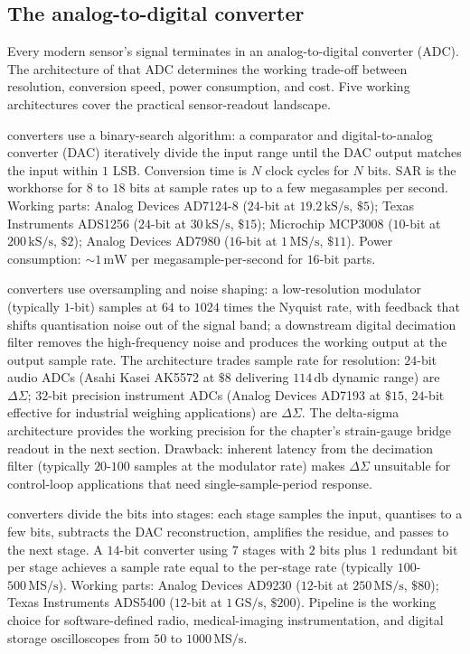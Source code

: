 \subsection{The analog-to-digital converter}

Every modern sensor's signal terminates in an analog-to-digital
converter (ADC). The architecture of that ADC determines the
working trade-off between resolution, conversion speed, power
consumption, and cost. Five working architectures cover the
practical sensor-readout landscape.

 converters use a
binary-search algorithm: a comparator and digital-to-analog
converter (DAC) iteratively divide the input range until the DAC
output matches the input within $1$ LSB. Conversion time is $N$
clock cycles for $N$ bits. SAR is the workhorse for $8$ to $18$
bits at sample rates up to a few megasamples per second. Working
parts: Analog Devices AD7124-8 ($24$-bit at $19.2\,\text{kS/s}$,
$\$5$); Texas Instruments ADS1256 ($24$-bit
at $30\,\text{kS/s}$, $\$15$); Microchip MCP3008
($10$-bit at $200\,\text{kS/s}$, $\$2$); Analog
Devices AD7980 ($16$-bit at $1\,\text{MS/s}$,
$\$11$). Power consumption: $\sim 1\,\si{\milli\watt}$ per
megasample-per-second for $16$-bit parts.

 converters
use oversampling and noise shaping: a low-resolution modulator
(typically $1$-bit) samples at $64$ to $1024$ times the Nyquist
rate, with feedback that shifts quantisation noise out of the
signal band; a downstream digital decimation filter removes the
high-frequency noise and produces the working output at the
output sample rate. The architecture trades sample rate for
resolution: $24$-bit audio ADCs (Asahi Kasei AK5572 at $\$8$
delivering $114\,\si{\decibel}$ dynamic range) are
$\Delta\Sigma$; $32$-bit precision instrument ADCs (Analog
Devices AD7193 at $\$15$, $24$-bit effective for industrial
weighing applications) are $\Delta\Sigma$. The delta-sigma
architecture provides the working precision for the chapter's
strain-gauge bridge readout in the next section. Drawback:
inherent latency from the decimation filter (typically $20$-$100$
samples at the modulator rate) makes $\Delta\Sigma$ unsuitable
for control-loop applications that need single-sample-period
response.

 converters divide the bits into stages: each
stage samples the input, quantises to a few bits, subtracts the
DAC reconstruction, amplifies the residue, and passes to the
next stage. A $14$-bit converter using $7$ stages with $2$ bits
plus $1$ redundant bit per stage achieves a sample rate equal to
the per-stage rate (typically $100$-$500\,\text{MS/s}$).
Working parts: Analog Devices AD9230 ($12$-bit at
$250\,\text{MS/s}$, $\$80$); Texas Instruments
ADS5400 ($12$-bit at $1\,\text{GS/s}$, $\$200$).
Pipeline is the working choice for software-defined radio,
medical-imaging instrumentation, and digital storage
oscilloscopes from $50$ to $1000\,\text{MS/s}$.

